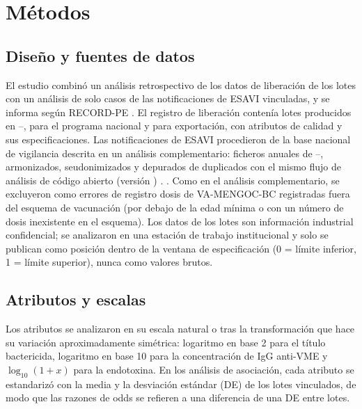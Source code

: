 \documentclass[11pt]{article}
\begin{document}
\section{Métodos}\label{sec:methods}

\subsection{Diseño y fuentes de datos}\label{sec:design}
El estudio combinó un análisis retrospectivo de los datos de liberación de los lotes con un análisis
de solo casos de las notificaciones de ESAVI vinculadas, y se informa según RECORD-PE
\cite{Langan2018}. El registro de liberación contenía \PTNLots{} lotes producidos en
\PTLotFirstYear--\PTLotLastYear, \PTNNationalLots{} para el programa nacional y \PTNExportLots{} para
exportación, con \PTNAttributes{} atributos de calidad y sus especificaciones. Las notificaciones de
ESAVI procedieron de la base nacional de vigilancia descrita en un análisis complementario:
\VNFiles{} ficheros anuales de \VStudyFirstYear--\VStudyLastYear, armonizados, seudonimizados y
depurados de duplicados con el mismo flujo de análisis de código abierto (versión \VCodeVersion)
\cite{Kahn2016,ENISA2019}. \VFormSentence. Como en el análisis complementario, se excluyeron como
errores de registro \PTScheduleExcluded{} dosis de VA-MENGOC-BC registradas fuera del esquema de
vacunación (por debajo de la edad mínima o con un número de dosis inexistente en el esquema). Los
datos de los lotes son información industrial confidencial; se
analizaron en una estación de trabajo institucional y solo se publican como posición dentro de la
ventana de especificación (0 = límite inferior, 1 = límite superior), nunca como valores brutos.

\subsection{Atributos y escalas}\label{sec:scales}
Los atributos se analizaron en su escala natural o tras la transformación que hace su variación
aproximadamente simétrica: logaritmo en base 2 para el título bactericida, logaritmo en base 10 para
la concentración de IgG anti-VME y $\log_{10}(1+x)$ para la endotoxina. En los análisis de asociación,
cada atributo se estandarizó con la media y la desviación estándar (DE) de los lotes vinculados, de
modo que las razones de odds se refieren a una diferencia de una DE entre lotes.
\end{document}
